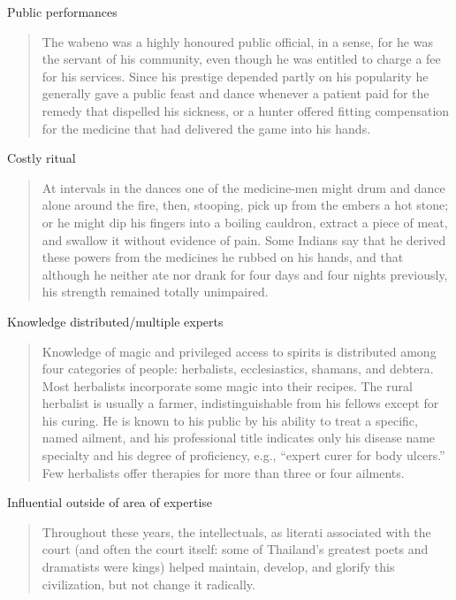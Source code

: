 \documentclass[
]{article}
\begin{document}
Public performances

\begin{quote}
The wabeno was a highly honoured public official, in a sense, for he was the servant of his community, even though he was entitled to charge a fee for his services. Since his prestige depended partly on his popularity he generally gave a public feast and dance whenever a patient paid for the remedy that dispelled his sickness, or a hunter offered fitting compensation for the medicine that had delivered the game into his hands.
\end{quote}

Costly ritual

\begin{quote}
At intervals in the dances one of the medicine-men might drum and dance alone around the fire, then, stooping, pick up from the embers a hot stone; or he might dip his fingers into a boiling cauldron, extract a piece of meat, and swallow it without evidence of pain. Some Indians say that he derived these powers from the medicines he rubbed on his hands, and that although he neither ate nor drank for four days and four nights previously, his strength remained totally unimpaired.
\end{quote}

Knowledge distributed/multiple experts

\begin{quote}
Knowledge of magic and privileged access to spirits is distributed among four categories of people: herbalists, ecclesiastics, shamans, and debtera. Most herbalists incorporate some magic into their recipes. The rural herbalist is usually a farmer, indistinguishable from his fellows except for his curing. He is known to his public by his ability to treat a specific, named ailment, and his professional title indicates only his disease name specialty and his degree of proficiency, e.g., ``expert curer for body ulcers.'' Few herbalists offer therapies for more than three or four ailments.
\end{quote}

Influential outside of area of expertise

\begin{quote}
Throughout these years, the intellectuals, as literati associated with the court (and often the court itself: some of Thailand's greatest poets and dramatists were kings) helped maintain, develop, and glorify this civilization, but not change it radically.
\end{quote}
\end{document}
